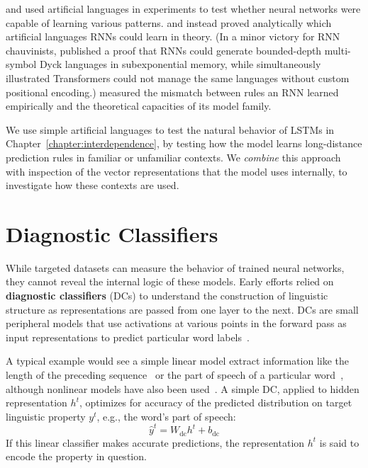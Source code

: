  \citet{bowman_tree-structured_2015} and \citet{hupkes_compositionality_2019} used artificial languages in experiments to test whether neural networks were capable of learning various patterns. \citet{merrill_formal_2020} and \citet{hewitt_rnns_2020} instead proved analytically which artificial languages RNNs could learn in theory. (In a minor victory for RNN chauvinists, \citet{hewitt_rnns_2020} published a proof that RNNs could generate bounded-depth multi-symbol Dyck languages in subexponential memory, while simultaneously \citet{bhattamishra_ability_2020} illustrated Transformers could not manage the same languages without custom positional encoding.) \citet{weiss_practical_2018} measured the mismatch between rules an RNN learned empirically and the theoretical capacities of its model family.
 
We use simple artificial languages to test the natural behavior of LSTMs in Chapter~\ref{chapter:interdependence}, by testing how the model learns long-distance prediction rules in familiar or unfamiliar contexts. We \textit{combine} this approach with inspection of the vector representations that the model uses internally, to investigate how these contexts are used.

\section{Diagnostic Classifiers} \label{sec:diagnostic_classifiers}

While targeted datasets can measure the behavior of trained neural networks, they cannot reveal the internal logic of these models. Early efforts relied on \textbf{diagnostic classifiers} (DCs) to understand the construction of linguistic structure as representations are passed from one layer to the next. DCs are small peripheral models that use activations at various points in the forward pass as input representations to predict particular word labels~\citep{belinkov_what_2017,hupkes_visualisation_2017,adi_fine-grained_2016,conneau_what_2018}.

A typical example would see a simple linear model extract information like the length of the preceding sequence~\citep{hupkes_visualisation_2017} or the part of speech of a particular word~\citep{giulianelli_under_2018}, although nonlinear models have also been used~\citep{belinkov_what_2017}. A simple DC, applied to hidden representation $h^t$, optimizes for accuracy of the predicted distribution on target linguistic property $y^t$, e.g., the word's part of speech:
\begin{equation}
    \hat{y}^t = W_{\textrm{dc}} h^t + b_{\textrm{dc}}
\end{equation}
If this linear classifier makes accurate predictions, the representation $h^t$ is said to encode the property in question.

